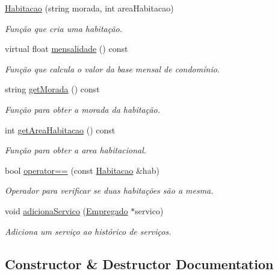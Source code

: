 \begin{DoxyCompactItemize}
\item 
\hyperlink{class_habitacao_a3b5e5edb0ca3b52025ef46a796fcf18d}{Habitacao} (string morada, int area\+Habitacao)
\begin{DoxyCompactList}\small\item\em Função que cria uma habitação. \end{DoxyCompactList}\item 
virtual float \hyperlink{class_habitacao_a479d2307661c87b05242b86ba849fb6e}{mensalidade} () const 
\begin{DoxyCompactList}\small\item\em Função que calcula o valor da base mensal de condomínio. \end{DoxyCompactList}\item 
string \hyperlink{class_habitacao_a17ef78eef7746f92bd2814893bfafbab}{get\+Morada} () const 
\begin{DoxyCompactList}\small\item\em Função para obter a morada da habitação. \end{DoxyCompactList}\item 
int \hyperlink{class_habitacao_a8b8dc61b41f3bda37f3e517fe63f877a}{get\+Area\+Habitacao} () const 
\begin{DoxyCompactList}\small\item\em Função para obter a area habitacional. \end{DoxyCompactList}\item 
bool \hyperlink{class_habitacao_acd290b8d83f41d4667867d5dc353166e}{operator==} (const \hyperlink{class_habitacao}{Habitacao} \&hab)
\begin{DoxyCompactList}\small\item\em Operador para verificar se duas habitações são a mesma. \end{DoxyCompactList}\item 
void \hyperlink{class_habitacao_a2a8c7343f36b0d9415aef14b09bca511}{adiciona\+Servico} (\hyperlink{class_empregado}{Empregado} $\ast$servico)
\begin{DoxyCompactList}\small\item\em Adiciona um serviço ao histórico de serviços. \end{DoxyCompactList}\end{DoxyCompactItemize}


\subsection{Constructor \& Destructor Documentation}
